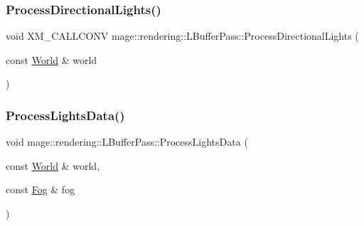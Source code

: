 \hypertarget{classmage_1_1rendering_1_1_l_buffer_pass_a97047b8acf6e4e552ab8f7b7ec08b1be}{}\label{classmage_1_1rendering_1_1_l_buffer_pass_a97047b8acf6e4e552ab8f7b7ec08b1be} 
\subsubsection{\texorpdfstring{Process\+Directional\+Lights()}{ProcessDirectionalLights()}}
{\footnotesize\ttfamily void X\+M\+\_\+\+C\+A\+L\+L\+C\+O\+NV mage\+::rendering\+::\+L\+Buffer\+Pass\+::\+Process\+Directional\+Lights (\begin{DoxyParamCaption}\item[{const \hyperlink{classmage_1_1rendering_1_1_world}{World} \&}]{world }\end{DoxyParamCaption})\hspace{0.3cm}{\ttfamily [private]}}

\hypertarget{classmage_1_1rendering_1_1_l_buffer_pass_a7f9034c92091a346bbd71f59426861ea}{}\label{classmage_1_1rendering_1_1_l_buffer_pass_a7f9034c92091a346bbd71f59426861ea} 
\subsubsection{\texorpdfstring{Process\+Lights\+Data()}{ProcessLightsData()}}
{\footnotesize\ttfamily void mage\+::rendering\+::\+L\+Buffer\+Pass\+::\+Process\+Lights\+Data (\begin{DoxyParamCaption}\item[{const \hyperlink{classmage_1_1rendering_1_1_world}{World} \&}]{world,  }\item[{const \hyperlink{classmage_1_1rendering_1_1_fog}{Fog} \&}]{fog }\end{DoxyParamCaption})\hspace{0.3cm}{\ttfamily [private]}}

\hypertarget{classmage_1_1rendering_1_1_l_buffer_pass_af9e7e859505ec7ee16155f4e11d98a67}{}\label{classmage_1_1rendering_1_1_l_buffer_pass_af9e7e859505ec7ee16155f4e11d98a67} 
